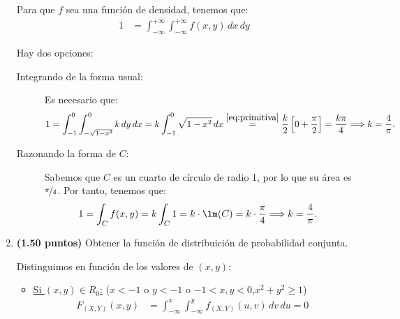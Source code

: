 \documentclass[12pt]{article}
\begin{document}
\begin{ejercicio}[5 puntos]
\begin{enumerate}
    Para que $f$ sea una función de densidad, tenemos que:
    \begin{align*}
        1&=\int_{-\infty}^{+\infty} \int_{-\infty}^{+\infty} f(x, y) \, dx \, dy
    \end{align*}

    Hay dos opciones:
    \begin{description}
        \item[Integrando de la forma usual:]
        
        Es necesario que:
        \begin{equation*}
            1=\int_{-1}^{0} \int_{-\sqrt{1-x^2}}^0 k \, dy \, dx = k\int_{-1}^{0} \sqrt{1-x^2} \, dx
            \stackrel{\eqref{eq:primitiva}}{=} \dfrac{k}{2}\left[0+\frac{\pi}{2}\right] = \dfrac{k\pi}{4} \Longrightarrow k=\dfrac{4}{\pi}.
        \end{equation*}

        \item[Razonando la forma de $C$:]
        
        Sabemos que $C$ es un cuarto de círculo de radio 1, por lo que su área es $\nicefrac{\pi}{4}$. Por tanto, tenemos que:
        \begin{equation*}
            1=\int_C f(x, y) = k\int_C 1 = k\cdot \lm(C) = k\cdot \dfrac{\pi}{4} \Longrightarrow k=\dfrac{4}{\pi}.
        \end{equation*}
    \end{description}
    
    \item \textbf{(1.50 puntos)} Obtener la función de distribuición de probabilidad conjunta.
    
    Distinguimos en función de los valores de $(x, y)$:
    \begin{itemize}
        \item \ul{Si $(x,y)\in R_0$:} ($x<-1$ o $y<-1$ o $-1<x,y<0$,$x^2+y^2\geq 1$)
        \begin{align*}
            F_{(X,Y)}(x, y) &= \int_{-\infty}^x \int_{-\infty}^y f_{(X,Y)}(u, v) \, dv \, du = 0
        \end{align*}


\end{itemize}
\end{enumerate}
\end{ejercicio}
\end{document}
